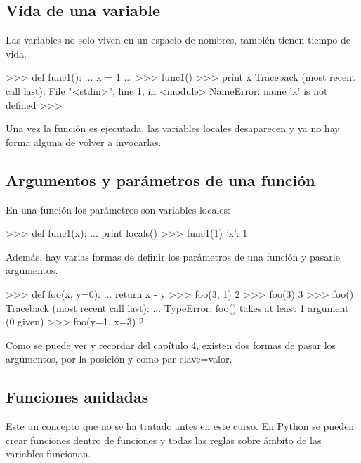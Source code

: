 \subsection{Vida de una variable}

Las variables no solo viven en un espacio de nombres, también tienen tiempo de vida.\\

\begin{pyglist} [language=python]
>>> def func1():
...     x = 1
... 
>>> func1()
>>> print x
Traceback (most recent call last):
  File "<stdin>", line 1, in <module>
NameError: name 'x' is not defined
>>> 
\end{pyglist}

Una vez la función es ejecutada, las variables locales desaparecen y ya no hay forma alguna de volver a invocarlas.

\subsection{Argumentos y parámetros de una función}

En una función los parámetros son variables locales: \\

\begin{pyglist} [language=python]
>>> def func1(x):
...     print locals()
>>> func1(1)
{'x': 1}
\end{pyglist}

Además, hay varias formas de definir los parámetros de una función y pasarle argumentos.\\

\begin{pyglist} [language=python]
>>> def foo(x, y=0):
...     return x - y
>>> foo(3, 1)
2
>>> foo(3)
3
>>> foo()
Traceback (most recent call last):
  ...
TypeError: foo() takes at least 1 argument (0 given)
>>> foo(y=1, x=3)
2
\end{pyglist}

Como se puede ver y recordar del capítulo 4, existen dos formas de pasar los argumentos, por la posición y como par clave=valor.

\subsection{Funciones anidadas}

Este un concepto que no se ha tratado antes en este curso. En Python se pueden crear funciones dentro de funciones y todas las reglas sobre ámbito de las variables funcionan.\\

